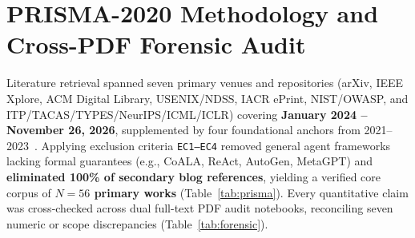 \documentclass[10pt,twocolumn]{article}
\begin{document}
\section{PRISMA-2020 Methodology and Cross-PDF Forensic Audit}
\label{sec:prisma}

Literature retrieval spanned seven primary venues and repositories (arXiv, IEEE Xplore, ACM Digital Library, USENIX/NDSS, IACR ePrint, NIST/OWASP, and ITP/TACAS/TYPES/NeurIPS/ICML/ICLR) covering \textbf{January 2024 -- November 26, 2026}, supplemented by four foundational anchors from 2021--2023~\cite{demoura2021lean4,yang2023leandojo,ho2022aeneas,nawrocki2023proofwidgets4}. Applying exclusion criteria \texttt{EC1--EC4} removed general agent frameworks lacking formal guarantees (e.g., CoALA, ReAct, AutoGen, MetaGPT) and \textbf{eliminated 100\% of secondary blog references}, yielding a verified core corpus of \textbf{$N = 56$ primary works} (Table~\ref{tab:prisma}). Every quantitative claim was cross-checked across dual full-text PDF audit notebooks, reconciling seven numeric or scope discrepancies (Table~\ref{tab:forensic}).
\end{document}
